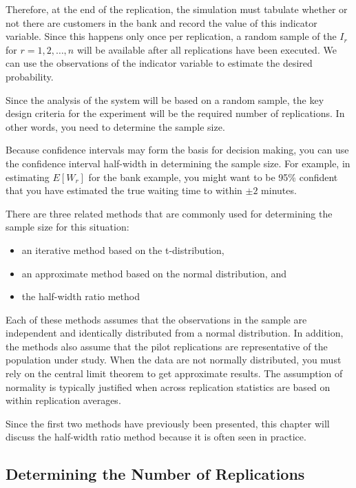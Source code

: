 \documentclass[
]{book}
\theoremstyle{definition}
\theoremstyle{definition}
\theoremstyle{definition}
\theoremstyle{definition}
\theoremstyle{remark}
\begin{document}
Therefore, at the end of the replication, the simulation must tabulate
whether or not there are customers in the bank and record the value of
this indicator variable. Since this happens only once per replication, a
random sample of the \(I_r\) for \(r = 1,2,\ldots,n\) will be available after all
replications have been executed. We can use
the observations of the indicator variable to estimate the desired
probability.

Since the analysis of the system will be based on a random sample, the
key design criteria for the experiment will be the required number of
replications. In other words, you need to determine the sample size.

Because confidence intervals may form the basis for decision making, you
can use the confidence interval half-width in determining the sample
size. For example, in estimating \(E[W_r]\) for the bank example, you
might want to be 95\% confident that you have estimated the true waiting
time to within \(\pm 2\) minutes.

There are three related methods that are commonly used for determining
the sample size for this situation:

\begin{itemize}
\item
  an iterative method based on the t-distribution,
\item
  an approximate method based on the normal distribution, and
\item
  the half-width ratio method
\end{itemize}

Each of these methods assumes that the observations in the sample are
independent and identically distributed from a normal distribution. In
addition, the methods also assume that the pilot replications are
representative of the population under study. When the data are not
normally distributed, you must rely on the central limit theorem to get
approximate results. The assumption of normality is typically justified
when across replication statistics are based on within replication
averages.

Since the first two methods have previously been presented, this chapter will discuss the half-width ratio method because it is often seen in practice.

\hypertarget{simoa:finhorizon:samplesize}{%
\subsection{Determining the Number of Replications}\label{simoa:finhorizon:samplesize}}
\end{document}
